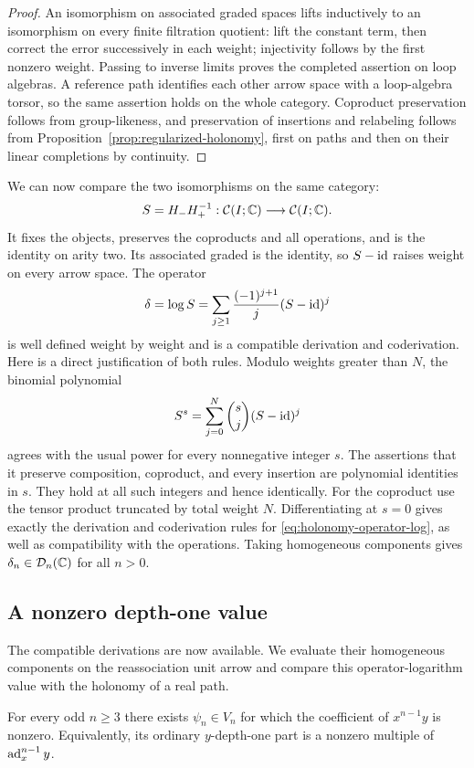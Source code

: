 \begin{proof}
An isomorphism on associated graded spaces lifts inductively to an
isomorphism on every finite filtration quotient: lift the constant
term, then correct the error successively in each weight; injectivity
follows by the first nonzero weight.  Passing to inverse limits proves
the completed assertion on loop algebras.  A reference path identifies
each other arrow space with a loop-algebra torsor, so the same assertion
holds on the whole category.  Coproduct preservation follows from
group-likeness, and preservation of insertions and relabeling follows
from Proposition~\ref{prop:regularized-holonomy}, first on paths and
then on their linear completions by continuity.
\end{proof}

We can now compare the two isomorphisms on the same category:
\[
 S=H_-H_+^{-1}:\mathcal C(I;\mathbb C)\longrightarrow\mathcal C(I;\mathbb C).
\]
It fixes the objects, preserves the coproducts and all operations,
and is the identity on arity two.  Its associated graded is the
identity, so $S-\mathrm{id}$ raises weight on every arrow space.  The operator
\begin{equation}\label{eq:holonomy-operator-log}
 \delta=\log S=
 \sum_{j\geq1}\frac{(-1)^{j+1}}j(S-\mathrm{id})^j
\end{equation}
is well defined weight by weight and is a compatible derivation and
coderivation.  Here is a direct justification of both rules.  Modulo
weights greater than $N$, the binomial polynomial
\[
 S^s=\sum_{j=0}^{N}\binom{s}{j}(S-\mathrm{id})^j
\]
agrees with the usual power for every nonnegative integer $s$.
The assertions that it preserve composition, coproduct, and every
insertion are polynomial identities in $s$.  They hold at all such
integers and hence identically.  For the coproduct use the tensor
product truncated by total weight $N$.  Differentiating at $s=0$
gives exactly the derivation and coderivation rules for
\eqref{eq:holonomy-operator-log}, as well as compatibility with the
operations.  Taking homogeneous components gives
$\delta_n\in\mathcal D_n(\mathbb C)$ for all $n>0$.

\subsection{A nonzero depth-one value}
The compatible derivations are now available.  We evaluate their
homogeneous components on the reassociation unit arrow and compare
this operator-logarithm value with the holonomy of a real path.

\begin{proposition}\label{prop:odd-depth-one}
For every odd $n\geq3$ there exists $\psi_n\in V_n$ for which the
coefficient of $x^{n-1}y$ is nonzero.  Equivalently, its ordinary
$y$-depth-one part is a nonzero multiple of $\operatorname{ad}_x^{n-1}y$.
\end{proposition}

